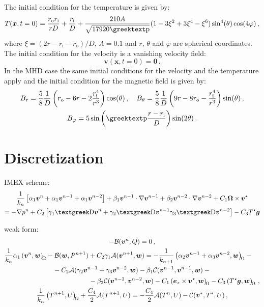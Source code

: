 The initial condition for the temperature is given by:
\begin{equation}
	T(\bm{x},t=\num{0})=\frac{r_\mathrm{o}r_\mathrm{i}}{rD}+\frac{r_\mathrm{i}}{D}+\frac{210A}{\sqrt{17920\gpi}}(1-3\xi^2+3\xi^4-\xi^6)\sin^4(\theta)\cos(4\varphi)\,,
\end{equation}
where $\xi=(2r-r_\mathrm{i}-r_\mathrm{o})/D$, $A=\num{0.1}$ and $r$, $\theta$ and $\varphi$ are spherical coordinates. The initial condition for the velocity is a vanishing velocity field:
\begin{equation}
	\bm{v}(\bm{x},t=\num{0})=\bm{0}\,.
\end{equation}
In the MHD case the same initial conditions for the velocity and the temperature apply and the initial condition for the magnetic field is given by:
\begin{equation}
\begin{gathered}
	B_r=\frac{5}{8}\frac{1}{D}\left(r_\mathrm{o}-6r-2\frac{r_\mathrm{i}^4}{r^3}\right)\cos(\theta)\,,\quad
	B_\theta=\frac{5}{8}\frac{1}{D}\left(9r-8r_\mathrm{o}-\frac{r_\mathrm{i}^4}{r^3}\right)\sin(\theta)\,,\\
	B_\varphi=5\sin\left(\gpi\frac{r-r_\mathrm{i}}{D}\right)\sin(2\theta)\,.
\end{gathered}
\end{equation}

\section{Discretization}

IMEX scheme:
\begin{multline}
	\frac{1}{k_n}\left[\alpha_1\bm{v}^n+\alpha_1\bm{v}^{n-1}+\alpha_1\bm{v}^{n-2}\right]+\beta_1\bm{v}^{n-1}\cdot\nabla\bm{v}^{n-1}+\beta_2\bm{v}^{n-2}\cdot\nabla\bm{v}^{n-2}+C_1\bm{\Omega}\times\bm{v}^\star\\
	=-\nabla p^n+C_2\left[\gamma_1\laplace\bm{v}^n+\gamma_2 \laplace\bm{v}^{n-1}\gamma_3\laplace\bm{v}^{n-2}\right]-C_3T^\star\bm{g}
\end{multline}

weak form:
\begin{gather}
	-\saddle{\bm{v}^{n}}{Q}=0\,, \\
	\begin{multlined}[c]
	\frac{1}{k_n}\alpha_1\inner{\bm{v}^{n}}{\bm{w}}-\saddle{\bm{w}}{P^{n+1}}+C_2\gamma_1\elliptic{\bm{v}^{n+1}}{\bm{w}}=-\frac{1}{k_{n+1}}\inner{\alpha_2\bm{v}^{n-1}+\alpha_3\bm{v}^{n-2}}{\bm{w}}-{}\\
	-C_2\elliptic{\gamma_2\bm{v}^{n-1}+\gamma_3\bm{v}^{n-2}}{\bm{w}}-\beta_1\convec{\bm{v}^{n-1}}{\bm{v}^{n-1}}{\bm{w}}-{}\\
	-\beta_2\convec{\bm{v}^{n-2}}{\bm{v}^{n-2}}{\bm{w}}-C_1\inner{\ez\times\bm{v}^\star}{\bm{w}}-C_3\inner{T^\star\bm{g}}{\bm{w}}\,,
	\end{multlined}\\
	\frac{1}{k_n}\inner{T^{n+1}}{U}+\frac{C_4}{2}\elliptic{T^{n+1}}{U}=-\frac{C_4}{2}\elliptic{T^n}{U}-\convec{\bm{v}^*}{T^*}{U}\,,
\end{gather}